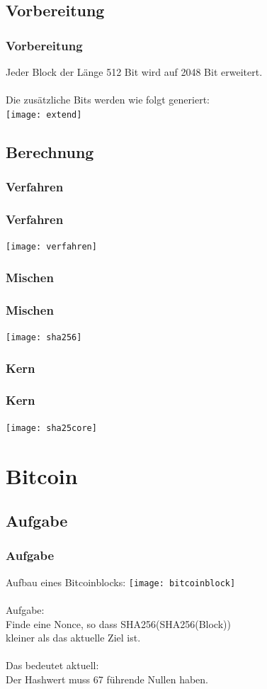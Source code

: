 \documentclass{beamer}
\begin{document}
\subsection{Vorbereitung}
  \begin{frame}
    \frametitle{Vorbereitung}
    Jeder Block der Länge 512 Bit wird auf 2048 Bit erweitert.\\
    ~\\
    Die zusätzliche Bits werden wie folgt generiert:\\
    \texttt{[image: extend]}
  \end{frame}
\subsection{Berechnung}
\subsubsection{Verfahren}
  \begin{frame}
    \frametitle{Verfahren}
    \texttt{[image: verfahren]}
  \end{frame}
\subsubsection{Mischen}
  \begin{frame}
    \frametitle{Mischen}
    \texttt{[image: sha256]}
  \end{frame}
\subsubsection{Kern}
  \begin{frame}
    \frametitle{Kern}
    \texttt{[image: sha25core]}
  \end{frame}
\section{Bitcoin}
\subsection{Aufgabe}
  \begin{frame}
    \frametitle{Aufgabe}
    Aufbau eines Bitcoinblocks:
    \texttt{[image: bitcoinblock]}\\
    ~\\
    Aufgabe:\\
    Finde eine Nonce, so dass SHA256(SHA256(Block))\\
    kleiner als das aktuelle Ziel ist.\\
    ~\\
    Das bedeutet aktuell:\\
    Der Hashwert muss 67 führende Nullen haben.
  \end{frame}
\end{document}
